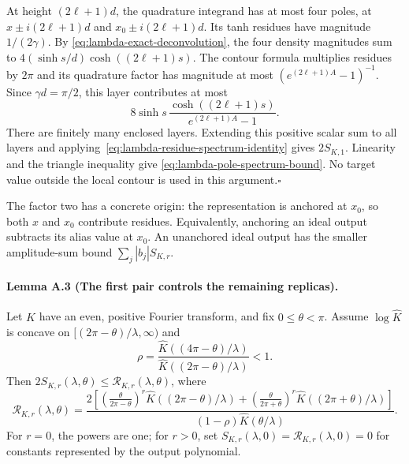 At height $(2\ell+1)d$, the quadrature integrand has at most four poles,
at $x\pm i(2\ell+1)d$ and $x_0\pm i(2\ell+1)d$. Its tanh residues
have magnitude $1/(2\gamma)$. By
\eqref{eq:lambda-exact-deconvolution}, the four density magnitudes sum to
$4(\sinh s/d)\cosh((2\ell+1)s)$.
The contour formula multiplies residues by $2\pi$ and its quadrature
factor has magnitude at most $(e^{(2\ell+1)A}-1)^{-1}$. Since
$\gamma d=\pi/2$, this layer contributes at most
\[
 8\sinh s\,
 \frac{\cosh((2\ell+1)s)}{e^{(2\ell+1)A}-1}.
\]
There are finitely many enclosed layers. Extending this positive scalar
sum to all layers and applying~\eqref{eq:lambda-residue-spectrum-identity}
gives $2S_{K,1}$. Linearity and the triangle inequality give
\eqref{eq:lambda-pole-spectrum-bound}. No target value outside the local
contour is used in this argument.\hfill$\square$

The factor two has a concrete origin: the representation is anchored
at $x_0$, so both $x$ and $x_0$ contribute residues. Equivalently, anchoring
an ideal output subtracts its alias value at $x_0$. An unanchored ideal
output has the smaller amplitude-sum bound $\sum_j|b_j|S_{K,r}$.

\paragraph{Lemma A.3 (The first pair controls the remaining replicas).}
Let $K$ have an even, positive Fourier transform, and fix $0\le\theta<\pi$.
Assume $\log \widehat K$ is concave on $[(2\pi-\theta)/\lambda,\infty)$ and
\begin{equation}
 \rho=\frac{\widehat K((4\pi-\theta)/\lambda)}{\widehat K((2\pi-\theta)/\lambda)}<1.
 \label{eq:lambda-tail-ratio}
\end{equation}
Then $2S_{K,r}(\lambda,\theta)\le\mathcal R_{K,r}(\lambda,\theta)$, where
\begin{equation}
 \mathcal R_{K,r}(\lambda,\theta)=
 \frac{2\left[
  \left(\frac{\theta}{2\pi-\theta}\right)^r\widehat K((2\pi-\theta)/\lambda)
  +\left(\frac{\theta}{2\pi+\theta}\right)^r\widehat K((2\pi+\theta)/\lambda)
 \right]}
 {(1-\rho)\widehat K(\theta/\lambda)}.
 \label{eq:lambda-compact-bound-appendix}
\end{equation}
For $r=0$, the powers are one; for $r>0$, set
$S_{K,r}(\lambda,0)=\mathcal R_{K,r}(\lambda,0)=0$ for constants
represented by the output polynomial.

